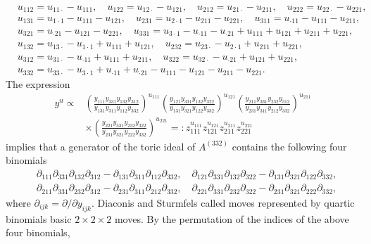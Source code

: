 \documentclass[a4paper,12pt]{article}
\theoremstyle{plain}
\theoremstyle{remark}
\begin{document}
\begin{align*}
  &u_{112}=u_{11\cdot}-u_{111}, \quad
   u_{122}=u_{12\cdot}-u_{121}, \quad
   u_{212}=u_{21\cdot}-u_{211}, \quad
   u_{222}=u_{22\cdot}-u_{221}, \\
  &u_{131}=u_{1\cdot1}-u_{111}-u_{121}, \quad
   u_{231}=u_{2\cdot1}-u_{211}-u_{221}, \quad
   u_{311}=u_{\cdot11}-u_{111}-u_{211}, \\
  &u_{321}=u_{\cdot21}-u_{121}-u_{221},\quad
   u_{331}=u_{3\cdot1}-u_{\cdot11}-u_{\cdot21}
   +u_{111}+u_{121}+u_{211}+u_{221},\\
  &u_{132}=u_{13\cdot}-u_{1\cdot1}+u_{111}+u_{121},\quad
   u_{232}=u_{23\cdot}-u_{2\cdot1}+u_{211}+u_{221},\\
  &u_{312}=u_{31\cdot}-u_{\cdot11}+u_{111}+u_{211},\quad
   u_{322}=u_{32\cdot}-u_{\cdot21}+u_{121}+u_{221},\\  
  &u_{332}=u_{33\cdot}-u_{3\cdot1}+u_{\cdot11}+u_{\cdot21}
   -u_{111}-u_{121}-u_{211}-u_{221}.
\end{align*}
The expression
\begin{align*}
y^u\propto&
\left(\frac{y_{111}y_{331}y_{132}y_{312}}{y_{131}y_{311}y_{112}y_{332}}\right)^{u_{111}}
\left(\frac{y_{121}y_{331}y_{132}y_{322}}{y_{131}y_{321}y_{122}y_{332}}\right)^{u_{121}}
\left(\frac{y_{211}y_{331}y_{232}y_{312}}{y_{231}y_{311}y_{212}y_{332}}\right)^{u_{211}}\\
&\times
\left(\frac{y_{221}y_{331}y_{232}y_{322}}{y_{231}y_{321}y_{222}y_{332}}\right)^{u_{221}}
=:z_{111}^{u_{111}}z_{121}^{u_{121}}z_{211}^{u_{211}}z_{221}^{u_{221}}
\end{align*}
implies that a generator of the toric ideal of $A^{(332)}$ contains
the following four binomials
\begin{align*}
&\partial_{111}\partial_{331}\partial_{132}\partial_{312}-
 \partial_{131}\partial_{311}\partial_{112}\partial_{332},\quad
 \partial_{121}\partial_{331}\partial_{132}\partial_{322}-
 \partial_{131}\partial_{321}\partial_{122}\partial_{332},\\
&\partial_{211}\partial_{331}\partial_{232}\partial_{312}-
 \partial_{231}\partial_{311}\partial_{212}\partial_{332},\quad
 \partial_{221}\partial_{331}\partial_{232}\partial_{322}-
 \partial_{231}\partial_{321}\partial_{222}\partial_{332},
\end{align*}
where $\partial_{ijk}=\partial/\partial y_{ijk}$. Diaconis and
Sturmfels \cite{DS98} called moves represented by quartic binomials
basic $2\times2\times2$ moves.
By the permutation of the indices of the above four binomials,
\end{document}
